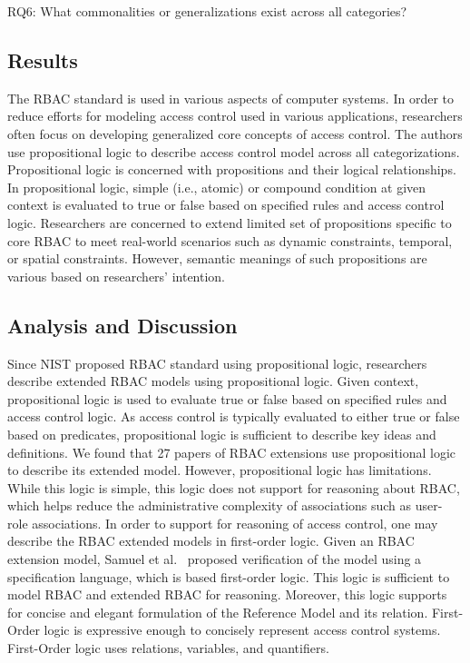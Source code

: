 RQ6: What commonalities or generalizations exist across all categories?

\subsection{Results}

The RBAC standard is used in various aspects of computer systems. In order to reduce efforts for modeling access control used in various applications, researchers often focus on developing generalized core concepts of access control.
The authors use propositional logic to describe access control model across all categorizations. Propositional logic is concerned with propositions and their logical relationships. In propositional logic, simple (i.e., atomic) or compound condition at given context is evaluated to true or false based on specified rules and access control logic. Researchers are concerned to extend limited set of propositions specific to core RBAC to meet real-world scenarios such as dynamic constraints, temporal, or spatial constraints. However, semantic meanings of such propositions are various based on researchers' intention.

\subsection{Analysis and Discussion}

Since NIST proposed RBAC standard using propositional logic, researchers describe extended RBAC models using propositional logic. Given context, propositional logic is used to evaluate true or false based on specified rules and access control logic. As access control is typically evaluated to either true or false based on predicates, propositional logic is sufficient to describe key ideas and definitions. We found that 27 papers of RBAC extensions use propositional logic to describe its extended model.
However, propositional logic has limitations. While this logic is simple, this logic does not support for reasoning about RBAC, which helps
reduce the administrative complexity of associations such as user- role associations.
In order to support for reasoning of access control, one may describe the RBAC extended models in first-order logic. 
Given an RBAC extension model, Samuel et al.~\cite{samuel07:spatio-temporal} proposed verification of the model using a specification language, which is based first-order logic. This logic is sufficient to model RBAC and extended RBAC for reasoning. Moreover, this logic supports for concise and elegant formulation of the Reference Model and its relation.  First-Order logic is expressive enough to concisely represent access control systems. First-Order logic uses relations, variables, and quantifiers.
